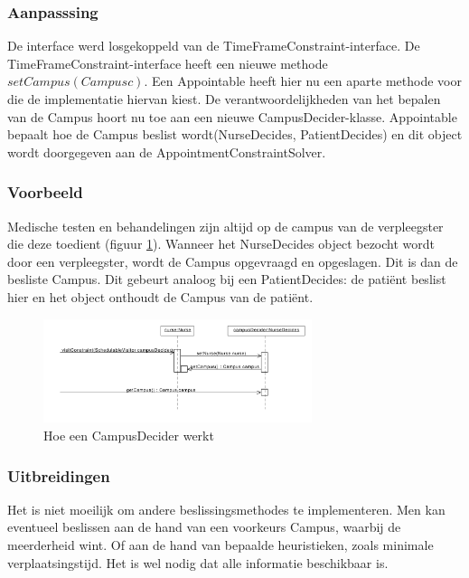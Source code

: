 \subsubsection{Aanpasssing}
De interface werd losgekoppeld van de TimeFrameConstraint-interface. 
De TimeFrameConstraint-interface heeft een nieuwe methode $setCampus(Campus c)$. 
Een Appointable heeft hier nu een aparte methode voor die de implementatie hiervan kiest. 
De verantwoordelijkheden van het bepalen van de Campus hoort nu toe aan een nieuwe CampusDecider-klasse.
Appointable bepaalt hoe de Campus beslist wordt(NurseDecides, PatientDecides) en dit object wordt doorgegeven aan de AppointmentConstraintSolver. 

\subsubsection{Voorbeeld}
Medische testen en behandelingen zijn altijd op de campus van de verpleegster die deze toedient (figuur \ref{fig:nurseDecides}). 
Wanneer het NurseDecides object bezocht wordt door een verpleegster, wordt de Campus opgevraagd en opgeslagen. 
Dit is dan de besliste Campus. Dit gebeurt analoog bij een PatientDecides: de patiënt beslist hier en het object onthoudt de Campus van de patiënt.

\begin{figure}
 \centering
 \includegraphics[width=0.7\textwidth]{./exported/interaction/nurseDecides.pdf}
 \caption{Hoe een CampusDecider werkt\label{fig:nurseDecides}}
\end{figure}

\subsubsection{Uitbreidingen}
Het is niet moeilijk om andere beslissingsmethodes te implementeren. 
Men kan eventueel beslissen aan de hand van een voorkeurs Campus, waarbij de meerderheid wint. 
Of aan de hand van bepaalde heuristieken, zoals minimale verplaatsingstijd.
Het is wel nodig dat alle informatie beschikbaar is.

